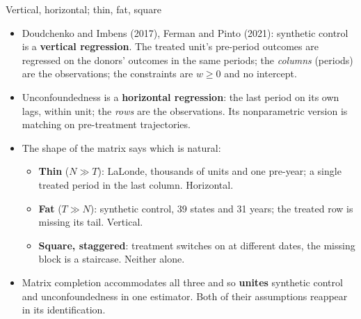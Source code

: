\documentclass[
  11pt,
  ignorenonframetext,
  aspectratio=169,
]{beamer}
\providecommand{\tightlist}{%
  \setlength{\itemsep}{0pt}\setlength{\parskip}{0pt}}
\begin{document}
\begin{frame}{Vertical, horizontal; thin, fat, square}
\protect{}\label{vertical-horizontal-thin-fat-square}
\begin{itemize}
\tightlist
\item
  Doudchenko and Imbens (2017), Ferman and Pinto (2021): synthetic
  control is a \textbf{vertical regression}. The treated unit's
  pre-period outcomes are regressed on the donors' outcomes in the same
  periods; the \emph{columns} (periods) are the observations; the
  constraints are \(w \geq 0\) and no intercept.
\item
  Unconfoundedness is a \textbf{horizontal regression}: the last period
  on its own lags, within unit; the \emph{rows} are the observations.
  Its nonparametric version is matching on pre-treatment trajectories.
\item
  The shape of the matrix says which is natural:

  \begin{itemize}
  \tightlist
  \item
    \textbf{Thin} (\(N \gg T\)): LaLonde, thousands of units and one
    pre-year; a single treated period in the last column. Horizontal.
  \item
    \textbf{Fat} (\(T \gg N\)): synthetic control, 39 states and 31
    years; the treated row is missing its tail. Vertical.
  \item
    \textbf{Square, staggered}: treatment switches on at different
    dates, the missing block is a staircase. Neither alone.
  \end{itemize}
\item
  Matrix completion accommodates all three and so \textbf{unites}
  synthetic control and unconfoundedness in one estimator. Both of their
  assumptions reappear in its identification.
\end{itemize}
\end{frame}
\end{document}
